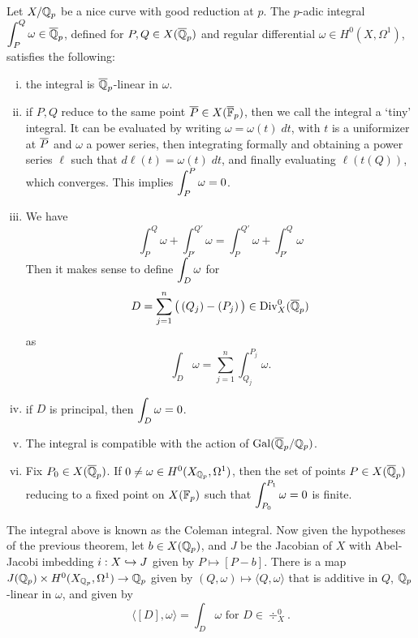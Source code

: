 \begin{thm}[Coleman]
Let $X/\mathbb{Q}_p$ be a nice curve with good reduction at $p$. The $p$-adic integral $\displaystyle\int_P^Q \omega \in \overline{\mathbb{Q}}_p$, defined for $P,Q \in X(\overline{\mathbb{Q}}_p)$ and regular differential $\omega \in H^0(X,\Omega^1)$, satisfies the following:

        \begin{enumerate}[(i)]
        \item the integral is $\overline{\mathbb{Q}}_p$-linear in $\omega$.
        
        \item if $P,Q$ reduce to the same point $\overline{P} \in X(\overline{\mathbb{F}}_p)$, then we call the integral a `tiny' integral. It can be evaluated by writing $\omega= \omega(t) \;dt$, with $t$ is a uniformizer at $\overline{P}$ and $\omega$ a power series, then integrating formally and obtaining a power series $\ell$ such that $d\ell(t)= \omega(t) \;dt$, and finally evaluating $\ell(t(Q))$, which converges. This implies $\displaystyle\int_P^P \omega= 0$.
        
        \item We have
        	\[
        	\int_P^Q \omega + \int_{P'}^{Q'} \omega= \int_P^{Q'} \omega + \int_{P'}^Q \omega
        	\]
	Then it makes sense to define $\displaystyle\int_D \omega$ for 
	\[
	D= \sum_{j=1}^n \big( \, (Q_j) - (P_j)\, \big) \in \operatorname{Div}_X^0(\overline{\mathbb{Q}}_p)
	\]
	as 
	\[
	\int_D \omega= \sum_{j=1}^n \int_{Q_j}^{P_j} \omega.
	\]
        
        \item if $D$ is principal, then $\displaystyle\int_D \omega= 0$.
        
        \item The integral is compatible with the action of $\operatorname{Gal}(\overline{\mathbb{Q}}_p/\mathbb{Q}_p)$.
        
        \item Fix $P_0 \in X(\overline{\mathbb{Q}}_p)$. If $0 \neq \omega \in H^0(X_{\mathbb{Q}_p}, \Omega^1)$, then the set of points $P \in X(\overline{\mathbb{Q}}_p)$ reducing to a fixed point on $X(\mathbb{F}_p)$ such that $\displaystyle\int_{P_0}^{P_1} \omega= 0$ is finite. 
        \end{enumerate}
\end{thm}


The integral above is known as the Coleman integral. Now given the hypotheses of the previous theorem, let $b \in X(\mathbb{Q}_p)$, and $J$ be the Jacobian of $X$ with Abel-Jacobi imbedding $i: X \hookrightarrow J$ given by $P \mapsto [P - b]$. There is a map $J(\mathbb{Q}_p) \times H^0(X_{\mathbb{Q}_p}, \Omega^1) \to \mathbb{Q}_p$ given by $(Q, \omega) \mapsto \langle Q, \omega \rangle$ that is additive in $Q$, $\mathbb{Q}_p$-linear in $\omega$, and given by 
	\[
	\langle [D], \omega \rangle= \int_D \omega \text{ for } D \in \div_X^0.
	\]


